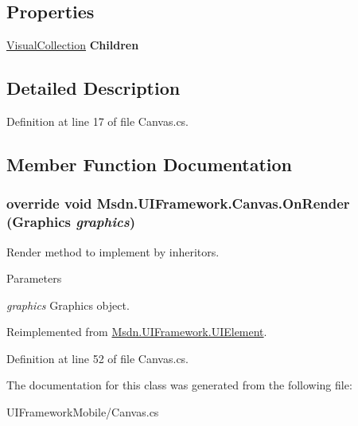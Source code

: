 \subsection*{Properties}
\begin{DoxyCompactItemize}
\item 
\hypertarget{class_msdn_1_1_u_i_framework_1_1_canvas_a563fb8b87d3081047437510af5d6d86a}{
\hyperlink{class_msdn_1_1_u_i_framework_1_1_visual_collection}{VisualCollection} {\bfseries Children}}
\label{class_msdn_1_1_u_i_framework_1_1_canvas_a563fb8b87d3081047437510af5d6d86a}

\end{DoxyCompactItemize}


\subsection{Detailed Description}


Definition at line 17 of file Canvas.cs.

\subsection{Member Function Documentation}
\hypertarget{class_msdn_1_1_u_i_framework_1_1_canvas_af1a17712fcb11abb9200f7780aa66136}{
\subsubsection[{OnRender}]{\setlength{\rightskip}{0pt plus 5cm}override void Msdn.UIFramework.Canvas.OnRender (Graphics {\em graphics})}}
\label{class_msdn_1_1_u_i_framework_1_1_canvas_af1a17712fcb11abb9200f7780aa66136}


Render method to implement by inheritors. 
\begin{DoxyParams}{Parameters}
\item[{\em graphics}]Graphics object.\end{DoxyParams}


Reimplemented from \hyperlink{class_msdn_1_1_u_i_framework_1_1_u_i_element_a20b2245806231553935896fe7731812b}{Msdn.UIFramework.UIElement}.

Definition at line 52 of file Canvas.cs.

The documentation for this class was generated from the following file:\begin{DoxyCompactItemize}
\item 
UIFrameworkMobile/Canvas.cs\end{DoxyCompactItemize}
